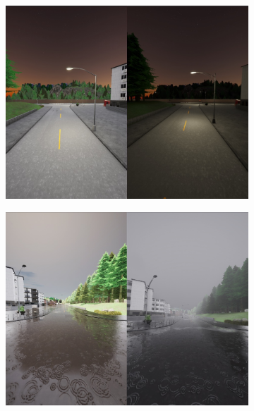\begin{figure}[htbp]
    \centering
    
    \begin{subfigure}[b]{0.6\textwidth}
        \centering
        \includegraphics[width=\textwidth]{chapters/2-background/figures/10-vs-14-1.jpeg}
        \label{fig:10-vs-14-1}
    \end{subfigure}

    \begin{subfigure}[b]{0.6\textwidth}
        \centering
        \includegraphics[width=\textwidth]{chapters/2-background/figures/10-vs-14-2.jpeg}
        \label{fig:10-vs-14-2}
    \end{subfigure}
    

\end{figure}
